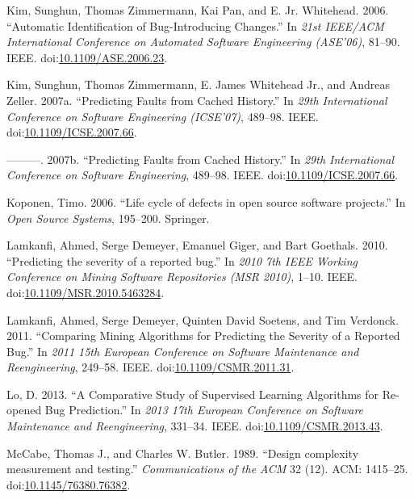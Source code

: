 \documentclass[natbib]{svjour3}
\begin{document}
\hypertarget{ref-Kim2006}{}
Kim, Sunghun, Thomas Zimmermann, Kai Pan, and E. Jr. Whitehead. 2006.
``Automatic Identification of Bug-Introducing Changes.'' In \emph{21st
IEEE/ACM International Conference on Automated Software Engineering
(ASE'06)}, 81--90. IEEE.
doi:\href{https://doi.org/10.1109/ASE.2006.23}{10.1109/ASE.2006.23}.

\hypertarget{ref-Kim2007a}{}
Kim, Sunghun, Thomas Zimmermann, E. James Whitehead Jr., and Andreas
Zeller. 2007a. ``Predicting Faults from Cached History.'' In \emph{29th
International Conference on Software Engineering (ICSE'07)}, 489--98.
IEEE.
doi:\href{https://doi.org/10.1109/ICSE.2007.66}{10.1109/ICSE.2007.66}.

\hypertarget{ref-Kim2007}{}
---------. 2007b. ``Predicting Faults from Cached History.'' In
\emph{29th International Conference on Software Engineering}, 489--98.
IEEE.
doi:\href{https://doi.org/10.1109/ICSE.2007.66}{10.1109/ICSE.2007.66}.

\hypertarget{ref-Koponen2006}{}
Koponen, Timo. 2006. ``Life cycle of defects in open source software
projects.'' In \emph{Open Source Systems}, 195--200. Springer.

\hypertarget{ref-Lamkanfi2010}{}
Lamkanfi, Ahmed, Serge Demeyer, Emanuel Giger, and Bart Goethals. 2010.
``Predicting the severity of a reported bug.'' In \emph{2010 7th IEEE
Working Conference on Mining Software Repositories (MSR 2010)}, 1--10.
IEEE.
doi:\href{https://doi.org/10.1109/MSR.2010.5463284}{10.1109/MSR.2010.5463284}.

\hypertarget{ref-Lamkanfi2011}{}
Lamkanfi, Ahmed, Serge Demeyer, Quinten David Soetens, and Tim Verdonck.
2011. ``Comparing Mining Algorithms for Predicting the Severity of a
Reported Bug.'' In \emph{2011 15th European Conference on Software
Maintenance and Reengineering}, 249--58. IEEE.
doi:\href{https://doi.org/10.1109/CSMR.2011.31}{10.1109/CSMR.2011.31}.

\hypertarget{ref-Lo2013}{}
Lo, D. 2013. ``A Comparative Study of Supervised Learning Algorithms for
Re-opened Bug Prediction.'' In \emph{2013 17th European Conference on
Software Maintenance and Reengineering}, 331--34. IEEE.
doi:\href{https://doi.org/10.1109/CSMR.2013.43}{10.1109/CSMR.2013.43}.

\hypertarget{ref-McCabe1989}{}
McCabe, Thomas J., and Charles W. Butler. 1989. ``Design complexity
measurement and testing.'' \emph{Communications of the ACM} 32 (12).
ACM: 1415--25.
doi:\href{https://doi.org/10.1145/76380.76382}{10.1145/76380.76382}.
\end{document}
